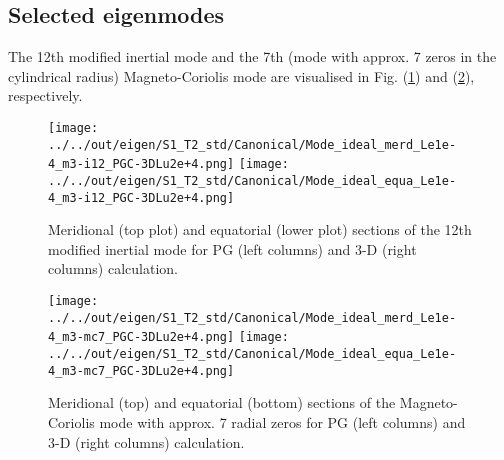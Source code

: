\subsection{Selected eigenmodes}

The 12th modified inertial mode and the 7th (mode with approx. 7 zeros in the cylindrical radius) Magneto-Coriolis mode are visualised in Fig. (\ref{fig:modePG3D-S1-T2-i12}) and (\ref{fig:modePG3D-S1-T2-mc7}), respectively.

\begin{figure}[ht]
    \centering
    \texttt{[image: ../../out/eigen/S1\_T2\_std/Canonical/Mode\_ideal\_merd\_Le1e-4\_m3-i12\_PGC-3DLu2e+4.png]}
    \texttt{[image: ../../out/eigen/S1\_T2\_std/Canonical/Mode\_ideal\_equa\_Le1e-4\_m3-i12\_PGC-3DLu2e+4.png]}
    \caption{Meridional (top plot) and equatorial (lower plot) sections of the 12th modified inertial mode for PG (left columns) and 3-D (right columns) calculation.}
    \label{fig:modePG3D-S1-T2-i12}
\end{figure}

\begin{figure}[ht]
    \centering
    \texttt{[image: ../../out/eigen/S1\_T2\_std/Canonical/Mode\_ideal\_merd\_Le1e-4\_m3-mc7\_PGC-3DLu2e+4.png]}
    \texttt{[image: ../../out/eigen/S1\_T2\_std/Canonical/Mode\_ideal\_equa\_Le1e-4\_m3-mc7\_PGC-3DLu2e+4.png]}
    \caption{Meridional (top) and equatorial (bottom) sections of the Magneto-Coriolis mode with approx. 7 radial zeros for PG (left columns) and 3-D (right columns) calculation.}
    \label{fig:modePG3D-S1-T2-mc7}
\end{figure}


\clearpage

